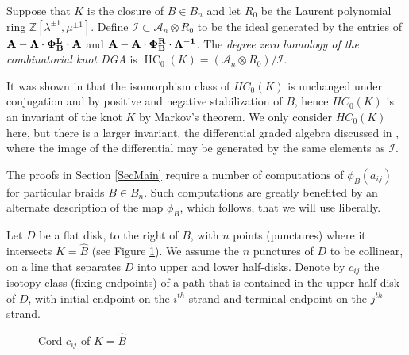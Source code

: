 \documentclass[11pt]{amsart}
\def\Z{{\mathbb Z}}
\def\A{{\mathcal A}}
\newenvironment{definition}[1][Definition]{\begin{trivlist}
\item[\hskip \labelsep {\bfseries #1}]}{\end{trivlist}}
\begin{document}
  \begin{definition}
  Suppose that $K$ is the closure of $B\in B_n$ and let $R_0$ be the Laurent polynomial ring $\Z[\lambda^{\pm 1},\mu^{\pm 1}]$. Define $\mathcal{I}\subset \A_n\otimes R_0$ to be the ideal generated by the entries of $\bf{A} - \Lambda\cdot\Phi_B^L\cdot \bf{A}$ and $\bf{A} - \bf{A}\cdot\Phi_B^R\cdot\Lambda^{-1}$.  The \emph{degree zero homology of the combinatorial knot DGA} is $\operatorname{HC}_0(K) = (\A_n\otimes R_0)/\mathcal{I}$.
  \label{defn:HC_0}
  \end{definition}
  
  It was shown in \cite{Ng08} that the isomorphism class of $HC_0(K)$ is unchanged under conjugation and by positive and negative stabilization of $B$, hence $HC_0(K)$ is an invariant of the knot $K$ by Markov's theorem. We only consider $HC_0(K)$ here, but there is a larger invariant, the differential graded algebra discussed in \cite{Ng12}, where the image of the differential may be generated by the same elements as $\mathcal I$.

  The proofs in Section \ref{SecMain} require a number of computations of $\phi_B(a_{ij})$ for particular braids $B\in B_n$. Such computations are greatly benefited by an alternate description of the map $\phi_B$, which follows, that we will use liberally.

  Let $D$ be a flat disk, to the right of $B$, with $n$ points (punctures) where it intersects $K=\widehat{B}$ (see Figure \ref{FigA_nGens}). We assume the $n$ punctures of $D$ to be collinear, on a line that separates $D$ into upper and lower half-disks. Denote by $c_{ij}$ the isotopy class (fixing endpoints) of a path that is contained in the upper half-disk of $D$, with initial endpoint on the $i^{th}$ strand and terminal endpoint on the $j^{th}$ strand.

  \begin{figure}[ht]
\caption{Cord $c_{ij}$ of $K=\widehat B$}
\label{FigA_nGens}
\end{figure}
\end{document}
